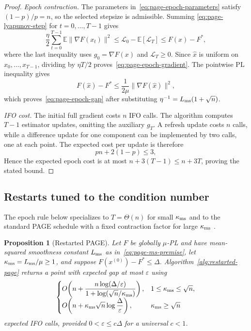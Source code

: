 \documentclass{article}
\newcommand{\E}{\mathbb{E}}
\newtheorem{proposition}[theorem]{Proposition}
\theoremstyle{definition}
\begin{document}
\begin{proof}
\emph{Epoch contraction.}
The parameters in~\eqref{eq:page-epoch-parameters} satisfy
$(1-p)/p=n$, so the selected stepsize is admissible.  Summing
\eqref{eq:page-lyapunov-step} for $t=0,\ldots,T-1$ gives
\begin{equation*}
 \frac\eta2\sum_{t=0}^{T-1}\E\|\nabla F(x_t)\|^2
 \le \mathcal L_0-\E[\mathcal L_T]
 \le F(x)-F^*,
\end{equation*}
where the last inequality uses $g_0=\nabla F(x)$ and $\mathcal L_T\ge0$.  Since
$\widehat x$ is uniform on $x_0,\ldots,x_{T-1}$, dividing by $\eta T/2$
proves~\eqref{eq:page-epoch-gradient}.  The pointwise PL inequality gives
\begin{equation}
 F(\widehat x)-F^*
 \le\frac1{2\mu}\|\nabla F(\widehat x)\|^2,
\end{equation}
which proves~\eqref{eq:page-epoch-gap} after substituting
$\eta^{-1}=L_{\rm ms}(1+\sqrt n)$.

\emph{IFO cost.}
The initial full gradient costs $n$ IFO calls.  The algorithm computes
$T-1$ estimator updates, omitting the auxiliary $g_T$.  A refresh update costs
$n$ calls, while a difference update for one component can be implemented by two
calls, one at each point.  The expected cost per update is therefore
\begin{equation}
 pn+2(1-p)\le3,
\end{equation}
Hence the expected epoch cost is at most $n+3(T-1)\le n+3T$, proving the
stated bound.
\end{proof}

\subsection{Restarts tuned to the condition number}

The epoch rule below specializes to $T=\Theta(n)$ for small
$\kappa_{\rm ms}$ and to the standard PAGE schedule with a fixed contraction factor for large
$\kappa_{\rm ms}$
\citep[Corollary~6]{li2021page}.

\begin{proposition}[Restarted PAGE]
\label{prop:restarted-page}
Let $F$ be globally $\mu$-PL and have mean-squared smoothness constant
$L_{\rm ms}$ as in~\eqref{eq:page-ms-premise}, let
$\kappa_{\rm ms}=L_{\rm ms}/\mu\ge1$, and suppose
$F(x^{(0)})-F^*\le\Delta$.  Algorithm~\ref{alg:restarted-page} returns a
point with expected gap at most $\varepsilon$ using
\begin{equation}
 \begin{cases}
 \displaystyle
 O\!\left(n+\frac{n\log(\Delta/\varepsilon)}
 {1+\log(\sqrt n/\kappa_{\rm ms})}\right),
 &1\le\kappa_{\rm ms}\le\sqrt n,\\[2mm]
 \displaystyle
 O\!\left(n+\kappa_{\rm ms}\sqrt n
 \log\frac{\Delta}{\varepsilon}\right),
 &\kappa_{\rm ms}\ge\sqrt n
 \end{cases}
 \label{eq:restarted-page-rate}
\end{equation}
expected IFO calls, provided
$0<\varepsilon\le c\Delta$ for a universal $c<1$.
\end{proposition}
\end{document}
